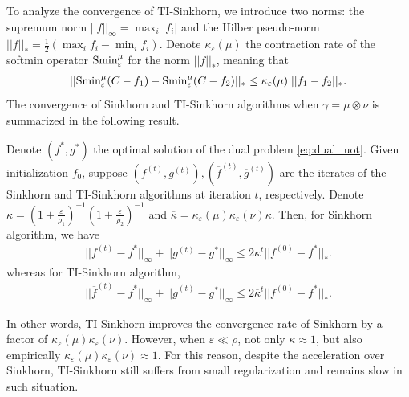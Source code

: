 To analyze the convergence of TI-Sinkhorn, we introduce two norms:
the supremum norm $||f||_{\infty} = \max_i | f_i|$ and the
Hilber pseudo-norm $||f||_* = \frac{1}{2} \left( \max_i f_i - \min_i f_i \right)$.
Denote $\kappa_{\varepsilon}(\mu)$ the contraction rate of the softmin operator
$\text{Smin}_{\varepsilon}^{\mu}$ for the norm $||f||_*$, meaning that
\begin{align}
  ||\text{Smin}_{\varepsilon}^{\mu}(C - f_1) - \text{Smin}_{\varepsilon}^{\mu}(C - f_2) ||_* \leq
  \kappa_{\varepsilon}(\mu) \; || f_1 - f_2 ||_*.
\end{align}
The convergence of Sinkhorn and TI-Sinkhorn algorithms when $\gamma = \mu \otimes \nu$
is summarized in the following result.
\begin{proposition}
   Denote $(f^*, g^*)$ the optimal solution of
  the dual problem \eqref{eq:dual_uot}. Given initialization $f_0$, suppose
  $(f^{(t)}, g^{(t)}), (\overline{f}^{(t)}, \overline{g}^{(t)})$ are the iterates
  of the Sinkhorn and TI-Sinkhorn algorithms at iteration $t$, respectively. Denote
  $\kappa = \left( 1 + \frac{\varepsilon}{\rho_1} \right)^{-1}
  \left( 1 + \frac{\varepsilon}{\rho_2} \right)^{-1}$
  and $\overline{\kappa} = \kappa_{\varepsilon}(\mu) \kappa_{\varepsilon}(\nu) \kappa$. Then,
  for Sinkhorn algorithm, we have
  \begin{align}
    || f^{(t)} - f^* ||_{\infty} + || g^{(t)} - g^* ||_{\infty} \leq
    2 \kappa^t || f^{(0)} - f^* ||_*.
  \end{align}
  whereas for TI-Sinkhorn algorithm,
  \begin{align}
    || \overline{f}^{(t)} - f^* ||_{\infty} + || \overline{g}^{(t)} - g^* ||_{\infty} \leq
    2 \overline{\kappa}^t || f^{(0)} - f^* ||_*.
  \end{align}
\end{proposition}
In other words, TI-Sinkhorn improves the convergence rate of Sinkhorn by a factor of
$\kappa_{\varepsilon}(\mu) \kappa_{\varepsilon}(\nu)$. However, when $\varepsilon \ll \rho$,
not only $\kappa \approx 1$, but also empirically
$\kappa_{\varepsilon}(\mu) \kappa_{\varepsilon}(\nu) \approx 1$.
For this reason, despite the acceleration over Sinkhorn,
TI-Sinkhorn still suffers from small regularization and remains slow in such situation.

